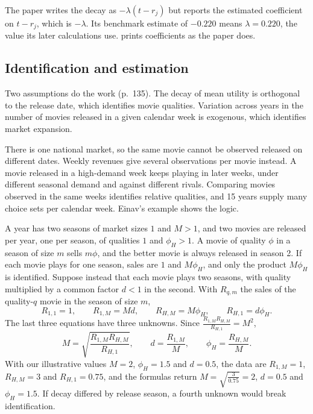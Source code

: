 The paper writes the decay as $-\lambda(t - r_j)$ but reports the estimated coefficient on $t - r_j$, which is
$-\lambda$. Its benchmark estimate of $-0.220$ means $\lambda = 0.220$, the value its later calculations use.
 prints coefficients as the paper does.

\subsection{Identification and estimation}\label{sec:07-einav-identification}

Two assumptions do the work (p.~135). The decay of mean utility is orthogonal to the release date, which identifies
movie qualities. Variation across years in the number of movies released in a given calendar week is exogenous,
which identifies market expansion.

There is one national market, so the same movie cannot be observed released on different dates. Weekly revenues
give several observations per movie instead. A movie released in a high-demand week keeps playing in later weeks,
under different seasonal demand and against different rivals. Comparing movies observed in the same weeks
identifies relative qualities, and 15 years supply many choice sets per calendar week. Einav's example shows the
logic.

\begin{example}\label{ex:07-einav-toy}
A year has two seasons of market sizes $1$ and $M > 1$, and two movies are released per year, one per season, of
qualities $1$ and $\phi_H > 1$. A movie of quality $\phi$ in a season of size $m$ sells $m\phi$, and the better
movie is always released in season 2. If each movie plays for one season, sales are $1$ and $M\phi_H$, and only
the product $M\phi_H$ is identified. Suppose instead that each movie plays two seasons, with quality multiplied by a
common factor $d < 1$ in the second. With $R_{q,m}$ the sales of the quality-$q$ movie in the season of size $m$,
\begin{equation*}
R_{1,1} = 1, \qquad R_{1,M} = Md, \qquad R_{H,M} = M\phi_H, \qquad R_{H,1} = d\phi_H .
\end{equation*}
The last three equations have three unknowns. Since $\frac{R_{1,M}R_{H,M}}{R_{H,1}} = M^2$,
\begin{equation*}
M = \sqrt{\frac{R_{1,M}R_{H,M}}{R_{H,1}}}, \qquad d = \frac{R_{1,M}}{M}, \qquad \phi_H =
\frac{R_{H,M}}{M}.
\end{equation*}
With our illustrative values $M = 2$, $\phi_H = 1.5$ and $d = 0.5$, the data are $R_{1,M} = 1$, $R_{H,M} =
3$ and $R_{H,1} = 0.75$, and the formulas return $M = \sqrt{\frac{3}{0.75}} = 2$, $d = 0.5$ and $\phi_H =
1.5$. If decay differed by release season, a fourth unknown would break identification.
\end{example}

